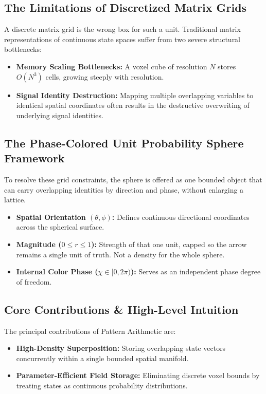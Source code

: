 \documentclass[12pt, a4paper]{article}
\begin{document}
\subsection{The Limitations of Discretized Matrix Grids}
A discrete matrix grid is the wrong box for such a unit. Traditional matrix representations of continuous state spaces suffer from two severe structural bottlenecks:
\begin{itemize}
    \item \textbf{Memory Scaling Bottlenecks:} A voxel cube of resolution $N$ stores $O(N^3)$ cells, growing steeply with resolution.
    \item \textbf{Signal Identity Destruction:} Mapping multiple overlapping variables to identical spatial coordinates often results in the destructive overwriting of underlying signal identities.
\end{itemize}

\subsection{The Phase-Colored Unit Probability Sphere Framework}
To resolve these grid constraints, the sphere is offered as one bounded object that can carry overlapping identities by direction and phase, without enlarging a lattice.
\begin{itemize}
    \item \textbf{Spatial Orientation $(\theta, \phi)$:} Defines continuous directional coordinates across the spherical surface.
    \item \textbf{Magnitude ($0 \leq r \leq 1$):} Strength of that one unit, capped so the arrow remains a single unit of truth. Not a density for the whole sphere.
    \item \textbf{Internal Color Phase ($\chi \in [0, 2\pi)$):} Serves as an independent phase degree of freedom.
\end{itemize}

\subsection{Core Contributions \& High-Level Intuition}
The principal contributions of Pattern Arithmetic are:
\begin{itemize}
    \item \textbf{High-Density Superposition:} Storing overlapping state vectors concurrently within a single bounded spatial manifold.
    \item \textbf{Parameter-Efficient Field Storage:} Eliminating discrete voxel bounds by treating states as continuous probability distributions.
\end{itemize}
\end{document}
